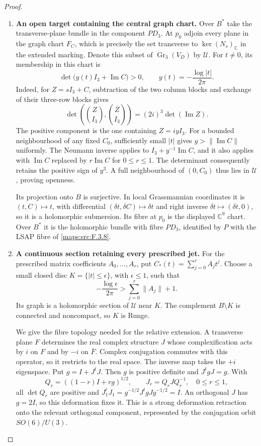 \begin{proof}
\begin{enumerate}[label=\arabic*.]
\item \textbf{An open target containing the central graph chart.}
Over $B^*$ take the transverse-plane bundle in the component
$PD_3$. At $p_0$ adjoin every plane in the graph chart $F_C$,
which is precisely the set transverse to $\ker(N_s)_\mathbb C$
in the extended marking. Denote this subset of
$\operatorname{Gr}_3(V_D)$ by $\mathscr U$.
For $t\ne0$, its membership in this chart is
\[
 \det\bigl(y(t)I_3+\operatorname{Im}C\bigr)>0,
 \qquad y(t)=-\frac{\log|t|}{2\pi}.
 \tag{F.O7}\label{maps:eq:F.O7}
\]
Indeed, for $Z=sI_3+C$, subtraction of the two column blocks
and exchange of their three-row blocks gives
\[
 \det\left(\binom Z{I_3},\binom{\overline Z}{I_3}\right)
       =(2i)^3\det(\operatorname{Im}Z).
\]
The positive component is the one containing $Z=iyI_3$.
For a bounded neighbourhood of any fixed $C_0$, sufficiently
small $|t|$ gives $y>\|\operatorname{Im}C\|$ uniformly.
The Neumann inverse applies to
$I_3+y^{-1}\operatorname{Im}C$, and it also applies with
$\operatorname{Im}C$ replaced by $r\operatorname{Im}C$ for
$0\le r\le1$. The determinant consequently retains the
positive sign of $y^3$. A full neighbourhood of $(0,C_0)$
thus lies in $\mathscr U$, proving openness.

Its projection onto $B$ is surjective. In local Grassmannian
coordinates it is $(t,C)\mapsto t$, with differential
$(\delta t,\delta C)\mapsto\delta t$ and right inverse
$\delta t\mapsto(\delta t,0)$, so it is a holomorphic
submersion. Its fibre at $p_0$ is the displayed $\mathbb C^9$
chart. Over $B^*$ it is the holomorphic bundle with fibre
$PD_3$, identified by $P$ with the LSAP fibre of
\ref{maps:src:F.3.8}.

\item \textbf{A continuous section retaining every prescribed jet.}
For the prescribed matrix coefficients $A_0,\ldots,A_r$,
put $C_*(t)=\sum_{j=0}^r A_jt^j$. Choose a small closed disc
$K=\{|t|\le\epsilon\}$, with $\epsilon\le1$, such that
\[
 -\frac{\log\epsilon}{2\pi}>
                  \sum_{j=0}^r\|A_j\|+1.
\]
Its graph is a holomorphic section of $\mathscr U$ near $K$.
The complement $B\setminus K$ is connected and noncompact,
so $K$ is Runge.

We give the fibre topology needed for the relative extension.
A transverse plane $F$ determines the real complex structure
$J$ whose complexification acts by $i$ on $F$ and by $-i$ on
$\overline F$. Complex conjugation commutes with this
operator, so it restricts to the real space. The inverse map
takes the $+i$ eigenspace. Put $g=I+J^tJ$. Then $g$ is
positive definite and $J^tgJ=g$. With
\[
 Q_r=((1-r)I+rg)^{1/2},\qquad J_r=Q_rJQ_r^{-1},
                   \quad 0\le r\le1,
\]
all $\det Q_r$ are positive and
$J_1^tJ_1=g^{-1/2}J^tgJg^{-1/2}=I$.
An orthogonal $J$ has $g=2I$, so this deformation fixes it.
This is a strong deformation retraction onto the relevant
orthogonal component, represented by the conjugation orbit
$SO(6)/U(3)$.


\end{enumerate}
\end{proof}
